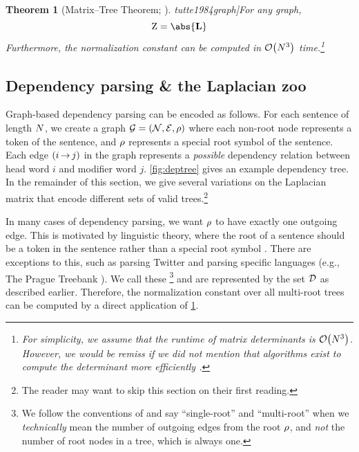 \documentclass[11pt,a4paper]{article}
\newtheorem{thm}{Theorem}
\theoremstyle{definition}
\begin{document}
\newcommand{\foo}[0]{\citet[p. 140]{tutte1984graph}}
\begin{thm}[Matrix--Tree Theorem; \foo]\label{thm:mtt}
For any graph, 
\begin{equation}\label{eq:minor}
    \wbar = \abs{\lap}
\end{equation}
Furthermore, the normalization constant can be computed in $\mathcal{O}\!\left({N}^3\right)$ time.\footnote{For simplicity, we assume that the runtime of matrix determinants is $\mathcal{O}\!\left({N}^3\right)$.  However, we would be remiss if we did not mention that algorithms exist to compute the determinant more efficiently \citep{dumas2016fast}.}
\end{thm}


\subsection{Dependency parsing \& the Laplacian zoo}
\label{sec:dep-parse}
Graph-based dependency parsing can be encoded as follows.
For each sentence of length ${N}$,
we create a graph $\mathcal{G}=({\mathcal{N}},{\mathcal{E}},{\rho})$ where 
each non-root node represents a token of the sentence, and ${\rho}$ represents a special root symbol of the sentence.
Each edge ${(i\,{\rightarrow}\,j)}$ in the graph represents a \emph{possible} dependency relation between 
head word $i$ and modifier word $j$.
\cref{fig:deptree} gives an example dependency tree.
In the remainder of this section, 
we give several variations on the Laplacian matrix that encode different sets of valid trees.\footnote{The reader may want to skip this section on their first reading.}

In many cases of dependency parsing, we want ${\rho}$ to have exactly one outgoing edge.
This is motivated by linguistic theory, where the root of a sentence should be a token in the sentence rather than a special root symbol \citep{tesniere1959elements}.
There are exceptions to this, such as 
parsing Twitter \citep{kong-etal-2014-dependency}
and parsing specific languages (e.g., The Prague Treebank \citep{prague_dep}).
We call these \footnote{We follow the conventions of \citet{koo-et-al-2007} and say ``single-root'' and ``multi-root'' when we \emph{technically} mean the number of outgoing edges from the root ${\rho}$, and \emph{not} the number of root nodes in a tree, which is always one.} and are represented by the set ${\mathcal{D}}$ as described earlier.
Therefore, the normalization constant over all multi-root trees can be computed by a direct application of \cref{thm:mtt}.
\end{document}
